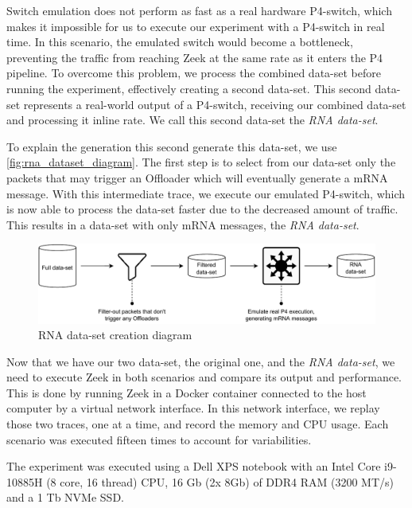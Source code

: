 Switch emulation does not perform as fast as a real hardware P4-switch, which makes it impossible for us to execute our experiment with a P4-switch in real time. In this scenario, the emulated switch would become a bottleneck, preventing the traffic from reaching Zeek at the same rate as it enters the P4 pipeline. To overcome this problem, we process the combined data-set before running the experiment, effectively creating a second data-set. This second data-set represents a real-world output of a P4-switch, receiving our combined data-set and processing it inline rate. We call this second data-set the \textit{RNA data-set}.

To explain the generation this second generate this data-set, we use \autoref{fig:rna_dataset_diagram}. The first step is to select from our data-set only the packets that may trigger an Offloader which will eventually generate a mRNA message. With this intermediate trace, we execute our emulated P4-switch, which is now able to process the data-set faster due to the decreased amount of traffic. This results in a data-set with only mRNA messages, the \textit{RNA data-set}.

\begin{figure}[htb]
    \caption{RNA data-set creation diagram}
    \begin{center}
        \includegraphics[width=1.0\textwidth]{images/rna_dataset_creation.pdf}  
    \end{center}
    \label{fig:rna_dataset_diagram}
\end{figure}

Now that we have our two data-set, the original one, and the \textit{RNA data-set}, we need to execute Zeek in both scenarios and compare its output and performance. This is done by running Zeek in a Docker container connected to the host computer by a virtual network interface. In this network interface, we replay those two traces, one at a time, and record the memory and CPU usage. Each scenario was executed fifteen times to account for variabilities.

The experiment was executed using a Dell XPS notebook with an Intel Core i9-10885H (8 core, 16 thread) CPU, 16 Gb (2x 8Gb) of DDR4 RAM (3200 MT/s) and a 1 Tb NVMe SSD.

